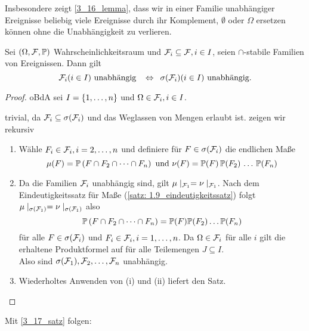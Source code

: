 Insbesondere zeigt \cref{3_16_lemma}, dass wir in einer Familie unabhängiger Ereignisse beliebig viele Ereignisse durch ihr Komplement, $\emptyset$ oder $\Omega$ ersetzen können ohne die Unabhängigkeit zu verlieren.

\begin{satz}
	\label{3_17_satz}
	Sei $(\Omega, \mathcal{F}, \mathbb{P})$ Wahrscheinlichkeitsraum und $\mathcal{F}_i \subseteq \mathcal{F}, i \in I$, seien $\cap$-stabile Familien von Ereignissen. Dann gilt
	\begin{equation*}
		\mathcal{F}_i (i \in I) \text{ unabhängig } \enskip \Leftrightarrow \enskip \sigma(\mathcal{F}_i) (i \in I) \text{ unabhängig}. 
	\end{equation*}
\end{satz}

\begin{proof}
	oBdA sei $I = \left\{ 1, \dots, n \right\}$ und $\Omega \in \mathcal{F}_i, i \in I$.
	\begin{proof-equivalence}[leftmargin=*, nolistsep]
		\rueckrichtung trivial, da $\mathcal{F}_i \subseteq \sigma(\mathcal{F}_i)$ und das Weglassen von Mengen erlaubt ist.
		\hinrichtung zeigen wir rekursiv
		\begin{enumerate}[label=(\roman*), nolistsep]
			\item Wähle $F_i \in \mathcal{F}_i, i = 2, \dots,n$ und definiere für $F \in \sigma(\mathcal{F}_i)$ die endlichen Maße
			\begin{equation*}
				\mu(F) = \mathbb{P}\left(  F \cap F_2 \cap \cdots \cap F_n \right) \text{ und } \nu(F) = \mathbb{P}(F) \, \mathbb{P}(F_2) \, \dots \, \mathbb{P}(F_n)
			\end{equation*}
			\item Da die Familien $\mathcal{F}_i$ unabhängig sind, gilt
			$\mu\mid_{\mathcal{F}_1} = \nu\mid_{\mathcal{F}_1}$.
			Nach dem Eindeutigkeitssatz für Maße (\cref{satz: 1.9_eindeutigkeitssatz}) folgt $\mu\mid_{\sigma(\mathcal{F}_1)} = \nu\mid_{\sigma(\mathcal{F}_1)}$ also
			\begin{equation*}
				\mathbb{P}\left(  F \cap F_2 \cap \cdots \cap F_n \right) = \mathbb{P}(F) \mathbb{P}(F_2) \dots \mathbb{P}(F_n)
			\end{equation*}
			für alle $F \in \sigma(\mathcal{F}_i)$ und $F_i \in \mathcal{F}_i, i = 1, \dots, n$. Da $\Omega \in \mathcal{F}_i$ für alle $i$ gilt die erhaltene Produktformel auf für alle Teilemengen $J \subseteq I$.\\
			Also sind $\sigma(\mathcal{F}_1), \mathcal{F}_2, \dots, \mathcal{F}_n$ unabhängig.
			\item Wiederholtes Anwenden von (i) und (ii) liefert den Satz.
		\end{enumerate}
	\end{proof-equivalence}
\end{proof}
%
Mit \cref{3_17_satz} folgen:

